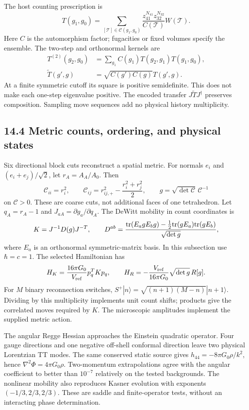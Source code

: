 \documentclass[11pt]{article}
\begin{document}
The host counting prescription is
\[
T(g_1,g_0)=\sum_{[\mathcal T]\in\mathcal C(g_1,g_0)}
\frac{z_{41}^{N_{41}}z_{32}^{N_{32}}}{C(\mathcal T)}
W(\mathcal T).
\]
Here \(C\) is the automorphism factor; fugacities or fixed
volumes specify the ensemble. The two-step and orthonormal
kernels are
\[
\begin{split}
T^{(2)}(g_2,g_0)&=\sum_{g_1}C(g_1)T(g_2,g_1)T(g_1,g_0),\\
\widetilde T(g',g)&=\sqrt{C(g')C(g)}T(g',g).
\end{split}
\]
At a finite symmetric cutoff its square is positive
semidefinite. This does not make each one-step eigenvalue
positive. The encoded transfer \(J\widetilde TJ^\dagger\)
preserves composition. Sampling move sequences add no
physical history multiplicity.

\subsection{14.4 Metric counts, ordering, and physical states}

Six directional block cuts reconstruct a spatial metric.
For normals \(e_i\) and \((e_i+e_j)/\sqrt2\), let
\(r_A=A_A/A_0\). Then
\[
\mathcal C_{ii}=r_i^2,\qquad
\mathcal C_{ij}=r_{ij,+}^2-\frac{r_i^2+r_j^2}{2},\qquad
\boxed{g=\sqrt{\det\mathcal C}\,\mathcal C^{-1}}
\]
on \(\mathcal C>0\). These are coarse cuts, not additional
faces of one tetrahedron. Let \(q_A=r_A-1\) and
\(J_{aA}=\partial g_a/\partial q_A\). The DeWitt mobility
in count coordinates is
\[
K=J^{-1}D(g)J^{-T},\qquad
D^{ab}=\frac{{\rm tr}(E_agE_bg)
-\tfrac12{\rm tr}(gE_a){\rm tr}(gE_b)}
{\sqrt{\det g}},
\]
where \(E_a\) is an orthonormal symmetric-matrix basis.
In this subsection use \(\hbar=c=1\).
The selected Hamiltonian has
\[
H_K=\frac{16\pi G_0}{V_{\rm ref}}p_q^TKp_q,\qquad
H_R=-\frac{V_{\rm ref}}{16\pi G_0}\sqrt{\det g}\,R[g].
\]
For \(M\) binary reconnection switches,
\(S^+|n\rangle=\sqrt{(n+1)(M-n)}|n+1\rangle\).
Dividing by this multiplicity implements unit count shifts;
products give the correlated moves required by \(K\).
The microscopic amplitudes implement the supplied metric action.

The angular Regge Hessian approaches the Einstein quadratic
operator. Four gauge directions and one negative off-shell
conformal direction leave two physical Lorentzian TT modes.
The same conserved static source gives
\(h_{44}=-8\pi G_0\rho/k^2\), hence
\(\nabla^2\Phi=4\pi G_0\rho\).
Two-momentum extrapolations agree with the angular coefficient
to better than \(10^{-7}\) relatively on the tested backgrounds.
The nonlinear mobility also reproduces Kasner evolution with
exponents \((-1/3,2/3,2/3)\).
These are saddle and finite-operator tests, without an
interacting phase determination.
\end{document}
